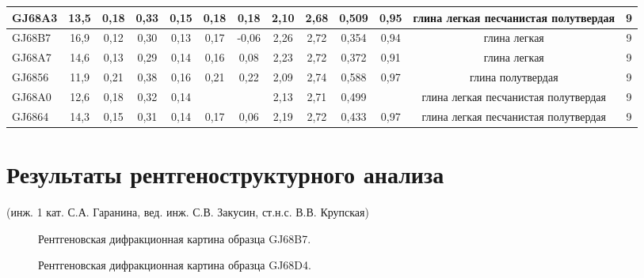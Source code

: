 \begin{sidewaystable}[p]
\begin{tabular}{@{}lcccccccccccc@{}}
    GJ68A3          & 13,5       & 0,18                         & 0,33   & 0,15   & 0,18   & 0,18     & 2,10     & 2,68      & 0,509   & 0,95     & глина легкая   песчанистая полутвердая       & 9   \\ \hline
    GJ68B7          & 16,9       & 0,12                         & 0,30   & 0,13   & 0,17   & -0,06    & 2,26     & 2,72      & 0,354   & 0,94     & глина легкая       & 9   \\ \hline
    GJ68A7          & 14,6       & 0,13                         & 0,29   & 0,14   & 0,16   & 0,08     & 2,23     & 2,72      & 0,372   & 0,91     & глина легкая                              & 9   \\ \hline
    GJ6856          & 11,9       & 0,21                         & 0,38   & 0,16   & 0,21   & 0,22     & 2,09     & 2,74      & 0,588   & 0,97     & глина полутвердая                            & 9   \\ \hline
    GJ68A0          & 12,6       & 0,18                         & 0,32   & 0,14   &        &          & 2,13     & 2,71      & 0,499   &          & глина легкая   песчанистая полутвердая       & 9   \\ \hline
    GJ6864          & 14,3       & 0,15                         & 0,31   & 0,14   & 0,17   & 0,06     & 2,19     & 2,72      & 0,433   & 0,97     & глина легкая   песчанистая полутвердая       & 9   \\ \hline
    \bottomrule 
    \end{tabular}
    \end{sidewaystable}


\chapter{Результаты рентгеноструктурного анализа}\label{app:difrac}
(инж. 1 кат. С.А. Гаранина, вед. инж. С.В. Закусин, ст.н.с. В.В. Крупская)

\begin{figure}[ht]
    \caption{Рентгеновская дифракционная картина образца GJ68B7.}\label{fig:fig}
  \end{figure}

  \begin{figure}[ht]
    \caption{Рентгеновская дифракционная картина образца GJ68D4.}\label{fig:fig}
  \end{figure}

